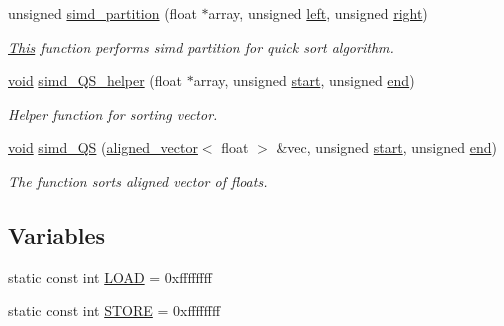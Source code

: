 \begin{DoxyCompactItemize}
unsigned \mbox{\hyperlink{namespaceHYBRID__SORT_a0fc451064018d2d6b471559c839ae865}{simd\+\_\+partition}} (float $\ast$array, unsigned \mbox{\hyperlink{glad_8h_a6358510bdde486b81c7951ee5c470ee4}{left}}, unsigned \mbox{\hyperlink{glad_8h_ab412e67df941b4600c352b0b9e76d2ee}{right}})
\begin{DoxyCompactList}\small\item\em \mbox{\hyperlink{classThis}{This}} function performs simd partition for quick sort algorithm. \end{DoxyCompactList}\item 
\mbox{\hyperlink{glad_8h_a950fc91edb4504f62f1c577bf4727c29}{void}} \mbox{\hyperlink{namespaceHYBRID__SORT_a6705c4bab0c4a4d439364440103a4647}{simd\+\_\+\+Q\+S\+\_\+helper}} (float $\ast$array, unsigned \mbox{\hyperlink{glad_8h_ac55adc720a3098c1b454d2a4647f4361}{start}}, unsigned \mbox{\hyperlink{glad_8h_a432111147038972f06e049e18a837002}{end}})
\begin{DoxyCompactList}\small\item\em Helper function for sorting vector. \end{DoxyCompactList}\item 
\mbox{\hyperlink{glad_8h_a950fc91edb4504f62f1c577bf4727c29}{void}} \mbox{\hyperlink{namespaceHYBRID__SORT_a6e4b9db525ba745c52e4f4add231b28e}{simd\+\_\+\+QS}} (\mbox{\hyperlink{type__definitions_8hpp_a087efd587d66b881646ef378f1919c90}{aligned\+\_\+vector}}$<$ float $>$ \&vec, unsigned \mbox{\hyperlink{glad_8h_ac55adc720a3098c1b454d2a4647f4361}{start}}, unsigned \mbox{\hyperlink{glad_8h_a432111147038972f06e049e18a837002}{end}})
\begin{DoxyCompactList}\small\item\em The function sorts aligned vector of floats. \end{DoxyCompactList}\end{DoxyCompactItemize}
\subsection*{Variables}
\begin{DoxyCompactItemize}
\item 
static const int \mbox{\hyperlink{namespaceHYBRID__SORT_a08bb817ae8599c88d4e11cc3496d7ed2}{L\+O\+AD}} = 0xffffffff
\item 
static const int \mbox{\hyperlink{namespaceHYBRID__SORT_a84b175b9bd35bd54e294de8488a8acd3}{S\+T\+O\+RE}} = 0xffffffff
\end{DoxyCompactItemize}


